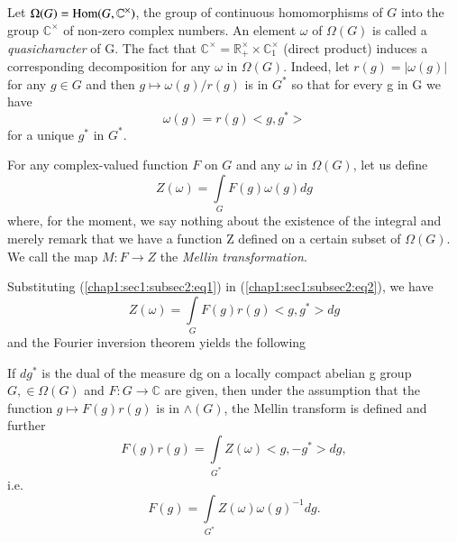 \subsection{}\label{chap1:sec1:subsec2} %

Let $\Omega(G)=\operatorname{Hom} (G,\mathbb{C}^\times)$, the group of continuous
homomorphisms of $G$ into the group $\mathbb{C}^\times$ of non-zero complex
numbers. An element $\omega$ of $\Omega(G)$ is called a {\em
  quasicharacter} of G. The fact that
$\mathbb{C}^\times=\mathbb{R}_+^\times \times \mathbb{C}_1^\times$ (direct product) induces
a corresponding decomposition for any $\omega$ in $\Omega(G)$. Indeed,
let $r(g)=|\omega(g)|$ for any $g\in G$ and then
$g\mapsto\omega(g)/r(g)$ is in $G^{\ast}$ so that for every g in G we
have
\begin{equation*}
  \omega(g)=r(g)<g,g^{\ast}>\tag{1}\label{chap1:sec1:subsec2:eq1} 
\end{equation*}
for a unique $g^{\ast}$ in $G^{\ast}$.

For any complex-valued function $F$ on $G$ and any $\omega$ in
$\Omega(G)$, let us define
\begin{equation*}
  Z(\omega)=\int\limits_GF(g)\omega(g)dg\tag{2}\label{chap1:sec1:subsec2:eq2}
\end{equation*}
where, for the moment, we say nothing about the existence of the
integral and merely remark that we have a function Z defined on a
certain subset of $\Omega(G)$. We call the map $M:F\rightarrow Z$
the {\em Mellin transformation}.

Substituting (\ref{chap1:sec1:subsec2:eq1}) in (\ref{chap1:sec1:subsec2:eq2}), we have
\begin{equation*}
  Z(\omega)=\int\limits_GF(g)r(g)<g,g^{\ast}>dg
\end{equation*}
and the Fourier inversion theorem yields the following

\setcounter{theorem}{1}
\begin{theorem} \label{chap1:sec1:subsec2:thm2} %
  If $dg^{\ast}$  is the dual of the measure dg  on a locally compact
  abelian g group $G,\in \Omega(G)$  and $F:G\rightarrow
  \mathbb{C}$ are given, then under the assumption that the function
  $g \mapsto F(g) r(g)$ is in $\wedge (G)$, the Mellin transform is
  defined and further 
  \begin{equation*}
    F(g)r(g)=\int\limits_{G^{\ast}} Z(\omega)<g,-g^{\ast}>dg,
  \end{equation*}
  i.e.\pageoriginale
  \begin{equation*}
    F(g)=\int\limits_{G^\ast}Z(\omega)\omega(g)^{-1}dg.
  \end{equation*}
\end{theorem}


